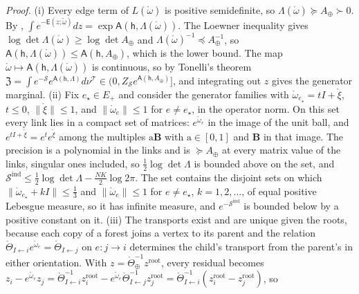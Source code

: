 \noindent\emph{Proof.}
(i) Every edge term of \(L(\mathring\omega)\) is positive semidefinite, so
\(\Lambda(\mathring\omega)\succeq A_\oplus\succ0\). By ,
\(\int e^{-\mathsf E(z;\mathring\omega)}dz=\exp\mathsf A(\mathsf h,\Lambda(\mathring\omega))\). The Loewner
inequality gives \(\log\det\Lambda(\mathring\omega)\geq\log\det A_\oplus\) and
\(\Lambda(\mathring\omega)^{-1}\preceq A_\oplus^{-1}\), so
\(\mathsf A(\mathsf h,\Lambda(\mathring\omega))\leq\mathsf A(\mathsf h,A_\oplus)\), which is the lower bound.
The map \(\mathring\omega\mapsto\mathsf A(\mathsf h,\Lambda(\mathring\omega))\) is continuous, so by
Tonelli's theorem
\(\mathfrak Z=\int e^{-\mathscr S}e^{\mathsf A(\mathsf h,\Lambda)}d\nu^{\mathscr T}\in(0,Z_{\mathscr S}e^{\mathsf A(\mathsf h,A_\oplus)}]\),
and integrating out \(z\) gives the generator marginal.
(ii) Fix \(e_\star\in E_+\) and consider the generator families with
\(\mathring\omega_{e_\star}=tI+\mathring\xi\), \(t\leq0\), \(\lVert\mathring\xi\rVert\leq1\), and
\(\lVert\mathring\omega_e\rVert\leq1\) for \(e\neq e_\star\), in the operator norm. On this set every link lies in
a compact set of matrices: \(e^{\mathring\omega_e}\) in the image of the unit ball, and
\(e^{tI+\mathring\xi}=e^te^{\mathring\xi}\) among the multiples \(\mathrm a\mathbf B\) with \(\mathrm a\in[0,1]\) and
\(\mathbf B\) in that image. The precision is a polynomial in the links and is \(\succeq A_\oplus\) at every
matrix value of the links, singular ones included, so \(\tfrac12\log\det\Lambda\) is bounded above on the
set, and \(\mathscr S^{\mathrm{ind}}\leq\tfrac12\log\det\Lambda-\tfrac{NK}2\log2\pi\). The set contains the
disjoint sets on which \(\lVert\mathring\omega_{e_\star}+kI\rVert\leq\tfrac13\) and
\(\lVert\mathring\omega_e\rVert\leq1\) for \(e\neq e_\star\), \(k=1,2,\ldots\), of equal positive Lebesgue
measure, so it has infinite measure, and \(e^{-\mathscr S^{\mathrm{ind}}}\) is bounded below by a positive
constant on it.
(iii) The transports exist and are unique given the roots, because each copy of a forest joins a vertex
to its parent and the relation \(\mathring\Theta_{I\leftarrow i}e^{\mathring\omega_e}=\mathring\Theta_{I\leftarrow j}\) on
\(e:j\to i\) determines the child's transport from the parent's in either orientation. With
\(z=\mathring\Theta_\oplus^{-1}z^{\mathrm{root}}\), every residual becomes
\(z_i-e^{\mathring\omega_e}z_j=\mathring\Theta_{I\leftarrow i}^{-1}z^{\mathrm{root}}_i-e^{\mathring\omega_e}\mathring\Theta_{I\leftarrow j}^{-1}z^{\mathrm{root}}_j
=\mathring\Theta_{I\leftarrow i}^{-1}(z^{\mathrm{root}}_i-z^{\mathrm{root}}_j)\), so

